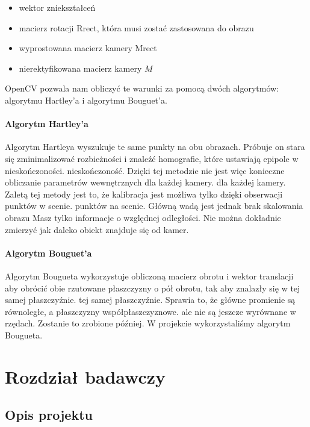 \documentclass[magisterska]{pracadypl}
\begin{document}
\begin{itemize}
  \item wektor zniekształceń
  \item macierz rotacji Rrect, która musi zostać zastosowana do obrazu
  \item wyprostowana macierz kamery Mrect
  \item nierektyfikowana macierz kamery $M$
\end{itemize}

OpenCV pozwala nam obliczyć te warunki za pomocą dwóch algorytmów: algorytmu Hartley'a
i algorytmu Bouguet'a.

\subsubsection{Algorytm Hartley'a}

Algorytm Hartleya wyszukuje te same punkty na obu obrazach. Próbuje on
stara się zminimalizować rozbieżności i znaleźć homografie, które ustawiają epipole w nieskończoności.
nieskończoność. Dzięki tej metodzie nie jest więc konieczne obliczanie parametrów wewnętrznych dla każdej kamery.
dla każdej kamery.
Zaletą tej metody jest to, że kalibracja jest możliwa tylko dzięki obserwacji punktów w scenie.
punktów na scenie. Główną wadą jest jednak brak skalowania obrazu
Masz tylko informacje o względnej odległości. Nie można dokładnie zmierzyć
jak daleko obiekt znajduje się od kamer.

\subsubsection{Algorytm Bouguet'a}

Algorytm Bougueta wykorzystuje obliczoną macierz obrotu i wektor translacji
aby obrócić obie rzutowane płaszczyzny o pół obrotu, tak aby znalazły się w tej samej płaszczyźnie.
tej samej płaszczyźnie. Sprawia to, że główne promienie są równoległe, a płaszczyzny współpłaszczyznowe.
ale nie są jeszcze wyrównane w rzędach. Zostanie to zrobione później.
W projekcie wykorzystaliśmy algorytm Bougueta.

\chapter{Rozdział badawczy}

\section{Opis projektu}
\end{document}
